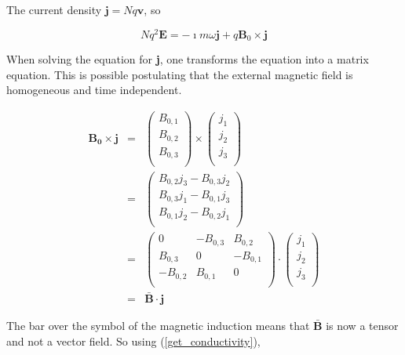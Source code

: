 \documentclass[a4paper,11pt]{thesis}
\begin{document}
The current density $\mathbf{j}=Nq\mathbf{v}$, so

\begin{equation}\label{get_conductivity}
    Nq^2\mathbf{E}= -\imath m \omega \mathbf{j}  +q \mathbf{B}_0 \times \mathbf{j}
\end{equation}

When solving the equation for \textbf{j}, one transforms the equation into a matrix equation. This is possible postulating that the external magnetic field is homogeneous and time independent.

\begin{eqnarray}
    \mathbf{B_0}\times \mathbf{j}&=&\left(%
\begin{array}{c}
  B_{0,1} \\
B_{0,2} \\
B_{0,3} \\\end{array}%
\right) \times \left(
\begin{array}{c}
  j_1 \\
j_2 \\
j_3 \\\end{array}%
\right)\\
&=&\left(%
\begin{array}{c}
  B_{0,2} j_3 -  B_{0,3} j_2\\
B_{0 ,3} j_1 -  B_{0,1} j_3 \\
B_{0,1} j_2 -  B_{0,2} j_1 \\\end{array}%
\right)\\
&=&\left(%
\begin{array}{ccc}
  0 & -B_{0,3} & B_{0,2} \\
B_{0,3} & 0 & -B_{0,1} \\
-B_{0,2} & B_{0,1} & 0 \\\end{array}%
\right)\cdot \left(
\begin{array}{c}
  j_{1} \\
j_{2} \\
j_{3} \\\end{array}%
\right)\\
&=&\bar{\mathbf{B}} \cdot \mathbf{j}
\end{eqnarray}


The bar over the symbol of the magnetic induction means that $\bar{\mathbf{B}}$ is now a tensor and not a vector field. So using (\ref{get_conductivity}),
\end{document}
